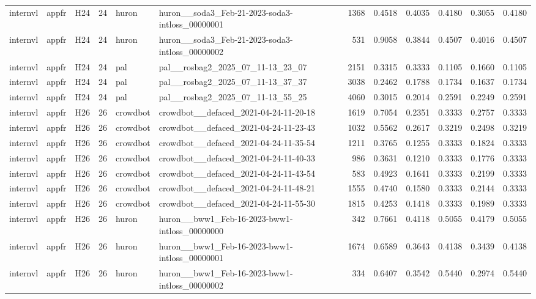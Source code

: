 \begin{table}[tbp]
\begin{tabular}{lllrllrrrrrr}
internvl & appfr & H24 & 24 & huron & huron\_\_soda3\_Feb-21-2023-soda3-intloss\_00000001 & 1368 & 0.4518 & 0.4035 & 0.4180 & 0.3055 & 0.4180 \\
internvl & appfr & H24 & 24 & huron & huron\_\_soda3\_Feb-21-2023-soda3-intloss\_00000002 & 531 & 0.9058 & 0.3844 & 0.4507 & 0.4016 & 0.4507 \\
internvl & appfr & H24 & 24 & pal & pal\_\_rosbag2\_2025\_07\_11-13\_23\_07 & 2151 & 0.3315 & 0.3333 & 0.1105 & 0.1660 & 0.1105 \\
internvl & appfr & H24 & 24 & pal & pal\_\_rosbag2\_2025\_07\_11-13\_37\_37 & 3038 & 0.2462 & 0.1788 & 0.1734 & 0.1637 & 0.1734 \\
internvl & appfr & H24 & 24 & pal & pal\_\_rosbag2\_2025\_07\_11-13\_55\_25 & 4060 & 0.3015 & 0.2014 & 0.2591 & 0.2249 & 0.2591 \\
internvl & appfr & H26 & 26 & crowdbot & crowdbot\_\_defaced\_2021-04-24-11-20-18 & 1619 & 0.7054 & 0.2351 & 0.3333 & 0.2757 & 0.3333 \\
internvl & appfr & H26 & 26 & crowdbot & crowdbot\_\_defaced\_2021-04-24-11-23-43 & 1032 & 0.5562 & 0.2617 & 0.3219 & 0.2498 & 0.3219 \\
internvl & appfr & H26 & 26 & crowdbot & crowdbot\_\_defaced\_2021-04-24-11-35-54 & 1211 & 0.3765 & 0.1255 & 0.3333 & 0.1824 & 0.3333 \\
internvl & appfr & H26 & 26 & crowdbot & crowdbot\_\_defaced\_2021-04-24-11-40-33 & 986 & 0.3631 & 0.1210 & 0.3333 & 0.1776 & 0.3333 \\
internvl & appfr & H26 & 26 & crowdbot & crowdbot\_\_defaced\_2021-04-24-11-43-54 & 583 & 0.4923 & 0.1641 & 0.3333 & 0.2199 & 0.3333 \\
internvl & appfr & H26 & 26 & crowdbot & crowdbot\_\_defaced\_2021-04-24-11-48-21 & 1555 & 0.4740 & 0.1580 & 0.3333 & 0.2144 & 0.3333 \\
internvl & appfr & H26 & 26 & crowdbot & crowdbot\_\_defaced\_2021-04-24-11-55-30 & 1815 & 0.4253 & 0.1418 & 0.3333 & 0.1989 & 0.3333 \\
internvl & appfr & H26 & 26 & huron & huron\_\_bww1\_Feb-16-2023-bww1-intloss\_00000000 & 342 & 0.7661 & 0.4118 & 0.5055 & 0.4179 & 0.5055 \\
internvl & appfr & H26 & 26 & huron & huron\_\_bww1\_Feb-16-2023-bww1-intloss\_00000001 & 1674 & 0.6589 & 0.3643 & 0.4138 & 0.3439 & 0.4138 \\
internvl & appfr & H26 & 26 & huron & huron\_\_bww1\_Feb-16-2023-bww1-intloss\_00000002 & 334 & 0.6407 & 0.3542 & 0.5440 & 0.2974 & 0.5440 \\

\end{tabular}
\end{table}
